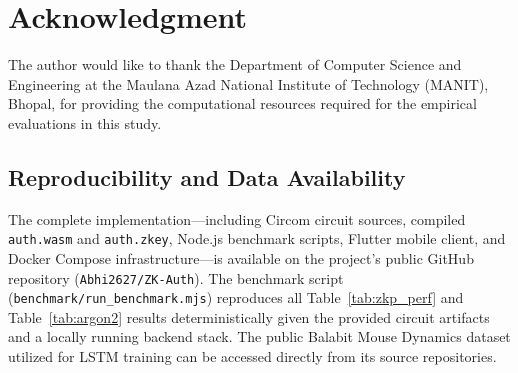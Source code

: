\documentclass[journal,twoside,10pt]{IEEEtran}
\begin{document}
\section*{Acknowledgment}
The author would like to thank the Department of Computer Science and Engineering at the Maulana Azad National Institute of Technology (MANIT), Bhopal, for providing the computational resources required for the empirical evaluations in this study.

\subsection*{Reproducibility and Data Availability}

The complete implementation---including Circom circuit sources, compiled
\texttt{auth.wasm} and \texttt{auth.zkey}, Node.js benchmark scripts,
Flutter mobile client, and Docker Compose infrastructure---is available on
the project's public GitHub repository (\texttt{Abhi2627/ZK-Auth}). The
benchmark script (\texttt{benchmark/run\_benchmark.mjs}) reproduces all
Table~\ref{tab:zkp_perf} and Table~\ref{tab:argon2} results deterministically
given the provided circuit artifacts and a locally running backend stack. 
The public Balabit Mouse Dynamics dataset utilized for LSTM training can be 
accessed directly from its source repositories.
\end{document}
